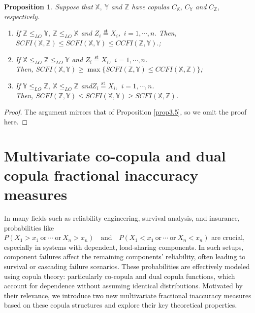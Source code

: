 \documentclass[12pt, a4paper]{article}
\numberwithin{equation}{section}
\newtheorem{proposition}{Proposition}[section]
\begin{document}
\begin{proposition}\label{prop4.7}
Suppose that $\mathbb{X},~\mathbb{Y}$ and $\mathbb{Z}$ have copulas $C_\mathbb{X},~C_\mathbb{Y}$ and $C_\mathbb{Z}$, respectively. 
\begin{enumerate}
	\item If $\mathbb{Z}\le_{LO}\mathbb{Y},~\mathbb{Z}\le_{LO}\mathbb{X}$ and $Z_i\overset{\mathrm{st}}{=}X_i$,~$i=1,\cdots,n$. 
	Then, $SCFI(\mathbb X,\mathbb Z)\leq SCFI(\mathbb X,\mathbb Y)\le CCFI(\mathbb Z,\mathbb Y).$;
	\item  If $\mathbb{X}\le_{LO}\mathbb{Z}\le_{LO}\mathbb{Y}$ and $Z_i\overset{\mathrm{st}}{=}X_i$,~$i=1,\cdots,n$. \\Then,
	$SCFI(\mathbb{X},\mathbb{Y})\ge \max\{SCFI(\mathbb{Z},\mathbb{Y})\le CCFI(\mathbb{X},\mathbb{Z})\}$;
	\item If $\mathbb{Y}\le_{LO}\mathbb{Z},~\mathbb{X}\le_{LO}\mathbb{Z}$ and$Z_i\overset{\mathrm{st}}{=}X_i$,~$i=1,\cdots,n$. \\Then,
	$SCFI(\mathbb Z,\mathbb Y)\leq SCFI(\mathbb{X},\mathbb{Y})\ge SCFI(\mathbb X,\mathbb Z)$.
\end{enumerate}
\end{proposition}

\begin{proof}
The argument mirrors that of Proposition \ref{prop3.5}, so we omit the proof here.
\end{proof}
\section{Multivariate co-copula and dual copula fractional inaccuracy measures}\label{sec5}
In many fields such as reliability engineering, survival analysis, and insurance, probabilities like
$
P(X_1 > x_1 ~\text{or}~ \cdots ~\text{or}~ X_n > x_n) \quad \text{and} \quad P(X_1 < x_1 ~\text{or}~ \cdots ~\text{or}~ X_n < x_n)
$
are crucial, especially in systems with dependent, load-sharing components. In such setups, component failures affect the remaining components' reliability, often leading to survival or cascading failure scenarios.
These probabilities are effectively modeled using copula theory: particularly co-copula and dual copula functions, which account for dependence without assuming identical distributions. Motivated by their relevance, we introduce two new multivariate fractional inaccuracy measures  based on these copula structures and explore their key theoretical properties.
\end{document}
